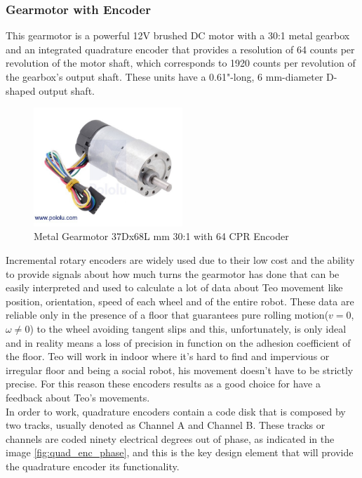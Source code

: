 \subsubsection{Gearmotor with Encoder}
\label{encoder}
This gearmotor is a powerful 12V brushed DC motor with a 30:1 metal gearbox and an integrated quadrature encoder that provides a resolution of 64 counts per revolution of the motor shaft, which corresponds to 1920 counts per revolution of the gearbox’s output shaft. These units have a 0.61"-long, 6 mm-diameter D-shaped output shaft\cite{encoders}.\\
\begin{figure}[h]
	\centering
	\includegraphics[width=0.5\textwidth]{gearmotor}
	\caption{Metal Gearmotor 37Dx68L mm 30:1 with 64 CPR Encoder}
	\label{fig:gearmotor}
\end{figure}
Incremental rotary encoders are widely used due to their low cost and the ability to provide signals about how much turns the gearmotor has done that can be easily interpreted and used to calculate a lot of data about Teo movement like position, orientation, speed of each wheel and of the entire robot. These data are reliable only in the presence of a floor that guarantees pure rolling motion($v=0$, $\omega\neq0$) to the wheel avoiding tangent slips and this, unfortunately, is only ideal and in reality means a loss of precision in function on the adhesion coefficient of the floor. Teo will work in indoor where it's hard to find and impervious or irregular floor and being a social robot, his movement doesn't have to be strictly precise. For this reason these encoders results as a good choice for have a feedback about Teo's movements.\\In order to work, quadrature encoders contain a code disk that is composed by two tracks, usually denoted as Channel A and Channel B. These tracks or channels are coded ninety electrical degrees out of phase, as indicated in the image \ref{fig:quad_enc_phase}, and this is the key design element that will provide the quadrature encoder its functionality.
